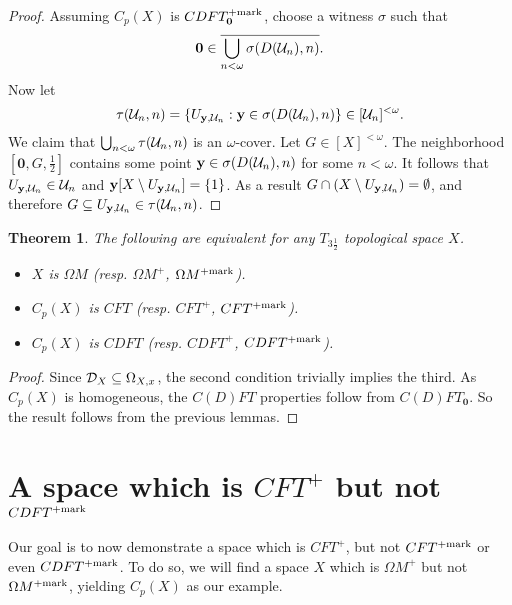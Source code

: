\documentclass{amsart}
\renewcommand{\vec}{\mathbf}
\theoremstyle{plain}
\newtheorem{theorem}{Theorem}
\theoremstyle{definition}
\theoremstyle{remark}
\theoremstyle{plain}
\theoremstyle{definition}
\theoremstyle{remark}
\begin{document}
\begin{proof}
  Assuming \(C_p(X)\) is \(CDFT_{\vec 0}^{\plusMark}\), choose a witness
  \(\sigma\) such that
  \[
    \vec 0
      \in
    \cl{\bigcup_{n<\omega} \sigma(D(\mc U_n),n)}
  .\]
  Now let
  \[
    \tau(\mc U_n,n)
      =
    \{
      U_{\vec y,\mc U_n}
    :
      \vec y \in \sigma(D(\mc U_n),n)
    \}
      \in
    [\mc U_n]^{<\omega}
  .\]
  We claim that \(\bigcup_{n<\omega}\tau(\mathcal{U}_n,n)\)
  is an \(\omega\)-cover.
  Let \(G\in[X]^{<\omega}\). The neighborhood \([\vec 0,G,\frac{1}{2}]\)
  contains some point \(\vec y\in \sigma(D(\mc U_n),n)\)
  for some \(n<\omega\). It follows
  that \(U_{\vec y,\mc U_n}\in\mc U_n\) and
  \(\vec y[X\setminus U_{\vec y,\mc U_n}]=\{1\}\). As a result
  \(G\cap(X\setminus U_{\vec y,\mc U_n})=\emptyset\), and therefore
  \(G\subseteq U_{\vec y,\mc U_n}\in\mc \tau(\mc U_n,n)\).
\end{proof}

\begin{theorem}\label{mengerFanTheorem}
  The following are equivalent for any \(T_{3\frac{1}{2}}\)
  topological space \(X\).
    \begin{itemize}
      \item \(X\) is \(\Omega M\)
            (resp. \(\Omega M^+\), \(\Omega M^{+\mathrm{mark}}\)).
      \item \(C_p(X)\) is \(CFT\)
            (resp. \(CFT^+\), \(CFT^{+\mathrm{mark}}\)).
      \item \(C_p(X)\) is \(CDFT\)
            (resp. \(CDFT^+\), \(CDFT^{+\mathrm{mark}}\)).
    \end{itemize}
\end{theorem}

\begin{proof}
  Since \(\mathcal{D}_X\subseteq \Omega_{X,x}\), the second condition trivially
  implies the third. As \(C_p(X)\) is homogeneous, the \(C(D)FT\) properties
  follow from \(C(D)FT_{\vec 0}\). So the result follows from the
  previous lemmas.
\end{proof}



\section{A space which is \(CFT^+\) but not \(CDFT^{+\mathrm{mark}}\)}

Our goal is to now demonstrate a space which is \(CFT^+\),
but not \(CFT^{+\mathrm{mark}}\) or even \(CDFT^{+\mathrm{mark}}\).
To do so, we will find a space \(X\)
which is \(\Omega M^+\) but not \(\Omega M^{+\mathrm{mark}}\), yielding \(C_p(X)\)
as our example.
\end{document}
